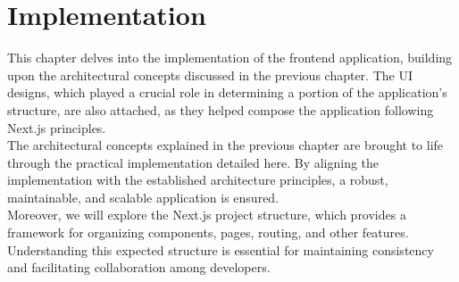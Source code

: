 \documentclass[./memory.tex]{subfiles}
\begin{document}
\chapter{Implementation}
This chapter delves into the implementation of the frontend application,
building upon the architectural concepts discussed in the previous chapter. The
UI designs, which played a crucial role in determining a portion of the
application's structure, are also attached, as they helped compose the
application following Next.js principles.
\\[8pt]
The architectural concepts explained in the previous chapter are brought to life
through the practical implementation detailed here. By aligning the
implementation with the established architecture principles, a robust,
maintainable, and scalable application is ensured.
\\[8pt]
Moreover, we will explore the Next.js project structure, which provides a
framework for organizing components, pages, routing, and other features.
Understanding this expected structure is essential for maintaining consistency
and facilitating collaboration among developers.
\end{document}
